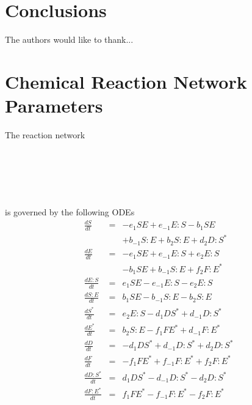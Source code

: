 \documentclass[twocolumn]{revtex4}
\begin{document}
\section{Conclusions} \label{sec:conclusions}

\begin{acknowledgments}
The authors would like to thank...
\end{acknowledgments}



\appendix

\section{Chemical Reaction Network Parameters}
The reaction network
\begin{center}
\\
\\
\\
\\
\end{center}

is governed by the following ODEs
\begin{equation}
    \begin{array}{rcl}
        \frac{d S}{dt} & = & -e_1 S E + e_{-1} E:S -b_1 S E \\
                        &   & + b_{-1} S:E + b_2 S:E + d_2 D:S^{*} \\
        \frac{d E}{dt} & = & -e_1 S E + e_{-1} E:S + e_2 E:S \\
                        &   & - b_1 S E +b_{-1} S:E + f_2 F:E^{*} \\
        \frac{d E:S}{dt}  & = & e_1 S E -e_{-1} E:S -e_2 E:S \\
        \frac{d S:E}{dt}& = & b_1 S E -b_{-1} S:E -b_2 S:E \\
        \frac{d S^{*}}{dt} & = & e_2 E:S -d_1 D S^{*} + d_{-1} D:S^{*} \\
        \frac{d E^{*}}{dt} & = & b_2 S:E -f_1 F E^{*} + d_{-1} F:E^{*} \\
        \frac{d D}{dt} & = & -d_1 D S^{*} + d_{-1} D:S^{*} + d_2 D:S^{*} \\
        \frac{dF}{dt} & = & -f_1 F E^{*} + f_{-1} F:E^{*} + f_2 F:E^{*} \\
        \frac{d D:S^{*}}{dt} & = & d_1 D S^{*} - d_{-1} D:S^{*} -d_2 D:S^{*} \\
        \frac{d F:E^{*}}{dt} & = & f_1 FE^{*} - f_{-1} F:E^{*} -f_2 F:E^{*}
    \end{array}
\end{equation}
\end{document}
